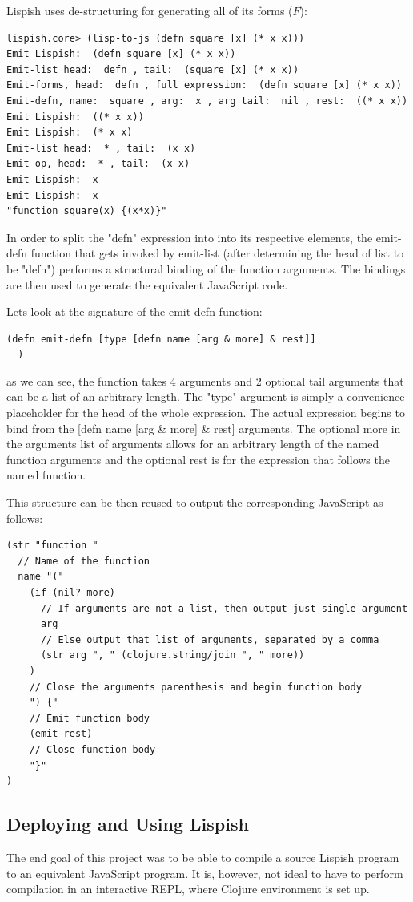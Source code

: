 Lispish uses de-structuring for generating all of its forms ($F$):
\begin{verbatim}
lispish.core> (lisp-to-js (defn square [x] (* x x)))
Emit Lispish:  (defn square [x] (* x x))
Emit-list head:  defn , tail:  (square [x] (* x x))
Emit-forms, head:  defn , full expression:  (defn square [x] (* x x))
Emit-defn, name:  square , arg:  x , arg tail:  nil , rest:  ((* x x))
Emit Lispish:  ((* x x))
Emit Lispish:  (* x x)
Emit-list head:  * , tail:  (x x)
Emit-op, head:  * , tail:  (x x)
Emit Lispish:  x
Emit Lispish:  x
"function square(x) {(x*x)}"
\end{verbatim}

In order to split the "defn" expression into into its respective elements, the emit-defn function that gets invoked by emit-list (after determining the head of list to be "defn") performs a structural binding of the function arguments. The bindings are then used to generate the equivalent JavaScript code. 

Lets look at the signature of the emit-defn function:
\begin{verbatim}
(defn emit-defn [type [defn name [arg & more] & rest]]
  )
\end{verbatim}
as we can see, the function takes 4 arguments and 2 optional tail arguments that can be a list of an arbitrary length. The "type" argument is simply a convenience placeholder for the head of the whole expression.
The actual expression begins to bind from the [defn name [arg \& more] \& rest] arguments. 
The optional more in the arguments list of arguments allows for an arbitrary length of the named function arguments and the optional rest is for the expression that follows the named function.

This structure can be then reused to output the corresponding JavaScript as follows:

\begin{verbatim}
(str "function "
  // Name of the function 
  name "("
    (if (nil? more) 
      // If arguments are not a list, then output just single argument
      arg 
      // Else output that list of arguments, separated by a comma
      (str arg ", " (clojure.string/join ", " more))
    )
    // Close the arguments parenthesis and begin function body
    ") {"
    // Emit function body
    (emit rest)
    // Close function body
    "}"
)
\end{verbatim}

\subsection{Deploying and Using Lispish}
The end goal of this project was to be able to compile a source Lispish program to an equivalent JavaScript program.
It is, however, not ideal to have to perform compilation in an interactive REPL, where Clojure environment is set up. 

